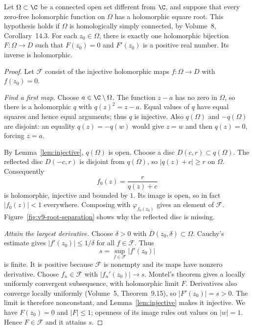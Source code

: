 \begin{theorem}\label{thm:riemannmap}
Let $\Omega\subset\C$ be a connected open set different from $\C$, and
suppose that every zero-free holomorphic function on $\Omega$ has a
holomorphic square root. This hypothesis holds if $\Omega$ is
homologically simply connected, by Volume~8, Corollary~14.3.
For each $z_0\in\Omega$, there is exactly one holomorphic bijection
$F:\Omega\to D$ such that $F(z_0)=0$ and $F'(z_0)$ is a positive real
number. Its inverse is holomorphic.
\end{theorem}
\begin{proof}
Let $\mathcal F$ consist of the injective holomorphic maps
$f:\Omega\to D$ with $f(z_0)=0$.

\emph{Find a first map.}
Choose $a\in\C\setminus\Omega$. The function $z-a$ has no zero in
$\Omega$, so there is a holomorphic $q$ with $q(z)^2=z-a$.
Equal values of $q$ have equal squares and hence equal arguments; thus $q$
is injective. Also $q(\Omega)$ and $-q(\Omega)$ are disjoint: an equality
$q(z)=-q(w)$ would give $z=w$ and then $q(z)=0$, forcing $z=a$.

By Lemma~\ref{lem:injective}, $q(\Omega)$ is open. Choose a disc
$D(c,r)\subset q(\Omega)$. The reflected disc $D(-c,r)$ is disjoint
from $q(\Omega)$, so $|q(z)+c|\ge r$ on $\Omega$. Consequently
\[
 f_0(z)=\frac r{q(z)+c}
\]
is holomorphic, injective and bounded by $1$. Its image is open, so in
fact $|f_0(z)|<1$ everywhere. Composing with
$\varphi_{f_0(z_0)}$ gives an element of $\mathcal F$.
Figure~\ref{fig:v9-root-separation} shows why the reflected disc is missing.

\emph{Attain the largest derivative.}
Choose $\delta>0$ with $\overline D(z_0,\delta)\subset\Omega$.
Cauchy's estimate gives $|f'(z_0)|\le1/\delta$ for all $f\in\mathcal F$.
Thus
\[
 s=\sup_{f\in\mathcal F}|f'(z_0)|
\]
is finite. It is positive because $\mathcal F$ is nonempty and its maps
have nonzero derivative. Choose $f_n\in\mathcal F$ with
$|f_n'(z_0)|\to s$. Montel's theorem gives a locally uniformly convergent
subsequence, with holomorphic limit $F$. Derivatives also converge locally
uniformly (Volume~5, Theorem~9.15), so $|F'(z_0)|=s>0$.
The limit is therefore nonconstant, and Lemma~\ref{lem:injective} makes
it injective. We have $F(z_0)=0$ and $|F|\le1$; openness of its image
rules out values on $|w|=1$. Hence $F\in\mathcal F$ and it attains $s$.


\end{proof}
